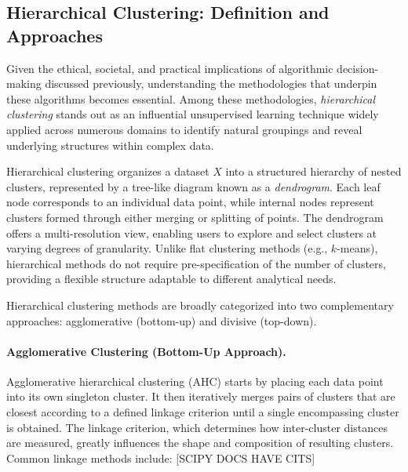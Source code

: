 \subsection{Hierarchical Clustering: Definition and Approaches}\label{subsec:hierarchical_clustering}

Given the ethical, societal, and practical implications of algorithmic decision-making discussed previously, understanding the methodologies that underpin these algorithms becomes essential. Among these methodologies, \textit{hierarchical clustering} stands out as an influential unsupervised learning technique widely applied across numerous domains to identify natural groupings and reveal underlying structures within complex data.

Hierarchical clustering organizes a dataset \(X\) into a structured hierarchy of nested clusters, represented by a tree-like diagram known as a \textit{dendrogram}. Each leaf node corresponds to an individual data point, while internal nodes represent clusters formed through either merging or splitting of points. The dendrogram offers a multi-resolution view, enabling users to explore and select clusters at varying degrees of granularity. Unlike flat clustering methods (e.g., \(k\)-means), hierarchical methods do not require pre-specification of the number of clusters, providing a flexible structure adaptable to different analytical needs.

Hierarchical clustering methods are broadly categorized into two complementary approaches: agglomerative (bottom-up) and divisive (top-down).

\paragraph{Agglomerative Clustering (Bottom-Up Approach).}
Agglomerative hierarchical clustering (AHC) starts by placing each data point into its own singleton cluster. It then iteratively merges pairs of clusters that are closest according to a defined linkage criterion until a single encompassing cluster is obtained. The linkage criterion, which determines how inter-cluster distances are measured, greatly influences the shape and composition of resulting clusters. Common linkage methods include: [SCIPY DOCS HAVE CITS]

